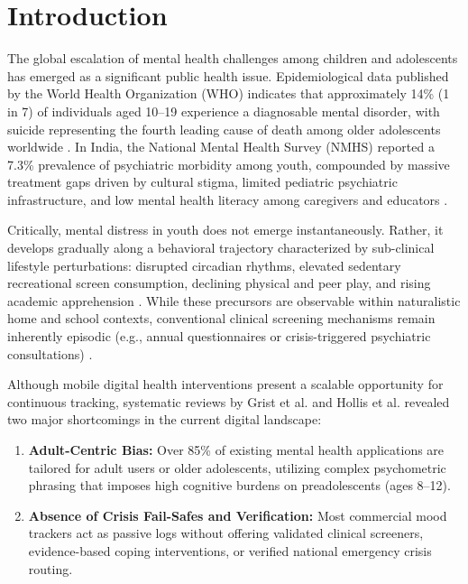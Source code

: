 \documentclass[conference]{IEEEtran}
\begin{document}
\section{Introduction}
\label{sec:intro}
The global escalation of mental health challenges among children and adolescents has emerged as a significant public health issue. Epidemiological data published by the World Health Organization (WHO) indicates that approximately 14\% (1 in 7) of individuals aged 10--19 experience a diagnosable mental disorder, with suicide representing the fourth leading cause of death among older adolescents worldwide \cite{who2022mental, unicef2021state}. In India, the National Mental Health Survey (NMHS) reported a 7.3\% prevalence of psychiatric morbidity among youth, compounded by massive treatment gaps driven by cultural stigma, limited pediatric psychiatric infrastructure, and low mental health literacy among caregivers and educators \cite{nmhs2016india, telemanas2022guidelines}.

Critically, mental distress in youth does not emerge instantaneously. Rather, it develops gradually along a behavioral trajectory characterized by sub-clinical lifestyle perturbations: disrupted circadian rhythms, elevated sedentary recreational screen consumption, declining physical and peer play, and rising academic apprehension \cite{bitsko2022mental, burke2019identifying}. While these precursors are observable within naturalistic home and school contexts, conventional clinical screening mechanisms remain inherently episodic (e.g., annual questionnaires or crisis-triggered psychiatric consultations) \cite{gardner1999psc17}.

Although mobile digital health interventions present a scalable opportunity for continuous tracking, systematic reviews by Grist et al. \cite{grist2017mental} and Hollis et al. \cite{hollis2017annual} revealed two major shortcomings in the current digital landscape:
\begin{enumerate}
    \item \textbf{Adult-Centric Bias:} Over 85\% of existing mental health applications are tailored for adult users or older adolescents, utilizing complex psychometric phrasing that imposes high cognitive burdens on preadolescents (ages 8--12).
    \item \textbf{Absence of Crisis Fail-Safes and Verification:} Most commercial mood trackers act as passive logs without offering validated clinical screeners, evidence-based coping interventions, or verified national emergency crisis routing.
\end{enumerate}
\end{document}
